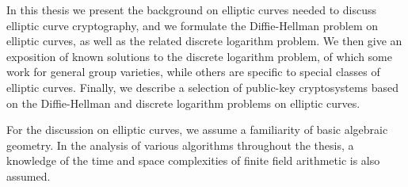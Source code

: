 In this thesis we present the background on elliptic curves needed to discuss elliptic curve cryptography, and we formulate the Diffie-Hellman problem on elliptic curves, as well as the related discrete logarithm problem. We then give an exposition of known solutions to the discrete logarithm problem, of which some work for general group varieties, while others are specific to special classes of elliptic curves. Finally, we describe a selection of public-key cryptosystems based on the Diffie-Hellman and discrete logarithm problems on elliptic curves.

For the discussion on elliptic curves, we assume a familiarity of basic algebraic geometry. In the analysis of various algorithms throughout the thesis, a knowledge of the time and space complexities of finite field arithmetic is also assumed.
